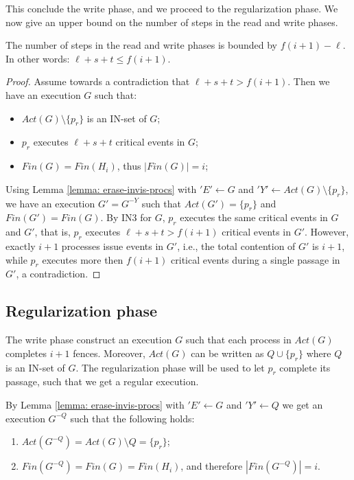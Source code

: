 This conclude the write phase, and we proceed to the regularization phase. We now give an upper bound on the number of steps in the read and write phases.

\begin{claim-section} \label{claim: write-upper-bound}
	The number of steps in the read and write phases is bounded by $f(i+1)-\ell$. In other words: $\ell+s+t \leq f(i+1)$.
\end{claim-section}

\begin{proof}
	Assume towards a contradiction that $\ell+s+t > f(i+1)$. Then we have an execution $G$ such that:
	\begin{itemize}
		\item $Act(G) \setminus \{p_r\}$ is an IN-set of $G$;
		\item $p_r$ executes $\ell+s+t$ critical events in $G$;
		\item $Fin(G) = Fin(H_i)$, thus $|Fin(G)| = i$;
	\end{itemize}

Using Lemma \ref{lemma: erase-invis-procs} with $'E' \leftarrow G$ and $'Y' \leftarrow Act(G) \setminus \{p_r\}$, we have an execution $G' = G^{-Y}$ such that $Act(G') = \{p_r\}$ and $Fin(G') = Fin(G)$. By IN3 for $G$, $p_r$ executes the same critical events in $G$ and $G'$, that is, $p_r$ executes $\ell+s+t > f(i+1)$ critical events in $G'$. However, exactly $i+1$ processes issue events in $G'$, i.e., the total contention of $G'$ is $i+1$, while $p_r$ executes more then $f(i+1)$ critical events during a single passage in $G'$, a contradiction.
\end{proof}



\newpage
\subsection{Regularization phase}
The write phase construct an execution $G$ such that each process in $Act(G)$ completes $i+1$ fences. Moreover, $Act(G)$ can be written as $Q \cup \{p_r\}$ where $Q$ is an IN-set of $G$. The regularization phase will be used to let $p_r$ complete its passage, such that we get a regular execution.

By Lemma \ref{lemma: erase-invis-procs} with $'E' \leftarrow G$ and $'Y' \leftarrow Q$ we get an execution $G^{-Q}$ such that the following holds:
\begin{enumerate}
	\item $Act(G^{-Q}) = Act(G) \setminus Q = \{p_r\}$;
	\item $Fin(G^{-Q}) = Fin(G) = Fin(H_i)$, and therefore $|Fin(G^{-Q})| = i$.
\end{enumerate}

